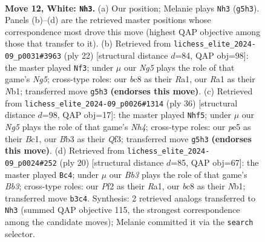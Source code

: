 \documentclass[11pt]{article}
\begin{document}
\begin{figure}[p]\centering
\begin{subfigure}{0.46\textwidth}\centering
\resizebox{\linewidth}{!}{%
\newchessgame
\chessboard[
  setfen={r1bq1rk1/2p1bppp/p1np1n2/4p1N1/Pp2P3/1B1P1Q2/1PP2PPP/RNB1R1K1 w - - 1 12},
  showmover=false,
  pgfstyle=straightmove, color=movearrow, markmove={g5-h3}
]}
\caption{}
\end{subfigure}\hfill
\begin{subfigure}{0.46\textwidth}\centering
\resizebox{\linewidth}{!}{%
\newchessgame
\chessboard[
  setfen={r2q1rk1/1bp1bppp/p1np1n2/1p2p1N1/3PP3/1BP4P/PP3PP1/RNBQR1K1 w - - 3 12},
  showmover=false,
  pgfstyle=straightmove, color=movearrow, markmove={g5-f3}
]}
\caption{}
\end{subfigure}
\\[4pt]
\begin{subfigure}{0.46\textwidth}\centering
\resizebox{\linewidth}{!}{%
\newchessgame
\chessboard[
  setfen={3r1qk1/1ppr1ppn/2nbb2p/pB2p3/P3P2N/2P2QNP/1P3PP1/R1B1R1K1 w - - 12 19},
  showmover=false,
  pgfstyle=straightmove, color=movearrow, markmove={h4-f5}
]}
\caption{}
\end{subfigure}\hfill
\begin{subfigure}{0.46\textwidth}\centering
\resizebox{\linewidth}{!}{%
\newchessgame
\chessboard[
  setfen={1rbq1rk1/2p1bppp/p1np1n2/P3p3/1p2P3/1BP2N2/1P1P1PPP/RNBQR1K1 w - - 1 11},
  showmover=false,
  pgfstyle=straightmove, color=movearrow, markmove={b3-c4}
]}
\caption{}
\end{subfigure}
\caption{\textbf{Move 12, White: \texttt{Nh3}.} (a) Our position; Melanie plays \texttt{Nh3} (\texttt{g5h3}). Panels (b)--(d) are the retrieved master positions whose correspondence most drove this move (highest QAP objective among those that transfer to it). (b) Retrieved from \texttt{lichess\_elite\_2024-09\_p0031\#3963} (ply 22) [structural distance $d$=84, QAP obj=98]: the master played \texttt{Nf3}; under $\mu$ our \emph{Ng5} plays the role of that game's \emph{Ng5}; cross-type roles: our \emph{b}c8 as their \emph{R}a1, our \emph{R}a1 as their \emph{N}b1; transferred move \texttt{g5h3} \textbf{(endorses this move)}. (c) Retrieved from \texttt{lichess\_elite\_2024-09\_p0026\#1314} (ply 36) [structural distance $d$=98, QAP obj=17]: the master played \texttt{Nhf5}; under $\mu$ our \emph{Ng5} plays the role of that game's \emph{Nh4}; cross-type roles: our \emph{p}e5 as their \emph{B}c1, our \emph{B}b3 as their \emph{Q}f3; transferred move \texttt{g5h3} \textbf{(endorses this move)}. (d) Retrieved from \texttt{lichess\_elite\_2024-09\_p0024\#252} (ply 20) [structural distance $d$=85, QAP obj=67]: the master played \texttt{Bc4}; under $\mu$ our \emph{Bb3} plays the role of that game's \emph{Bb3}; cross-type roles: our \emph{P}f2 as their \emph{R}a1, our \emph{b}c8 as their \emph{N}b1; transferred move \texttt{b3c4}. Synthesis: 2 retrieved analogs transferred to \texttt{Nh3} (summed QAP objective 115, the strongest correspondence among the candidate moves); Melanie committed it via the \texttt{search} selector.}
\label{fig:thought-m22}
\end{figure}
\end{document}
